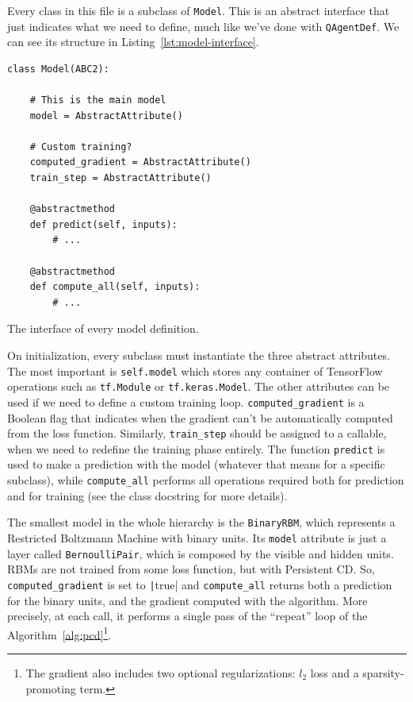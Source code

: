 Every class in this file is a subclass of \texttt{Model}. This is an abstract
interface that just indicates what we need to define, much like we've done
with \texttt{QAgentDef}. We can see its structure in
Listing~\ref{lst:model-interface}.
\begin{listing}
\begin{verbatim}
class Model(ABC2):

    # This is the main model
    model = AbstractAttribute()

    # Custom training?
    computed_gradient = AbstractAttribute()
    train_step = AbstractAttribute()

    @abstractmethod
    def predict(self, inputs):
        # ...

    @abstractmethod
    def compute_all(self, inputs):
        # ...
\end{verbatim}
\caption{The interface of every model definition.}
\label{lst:model-interface}
\end{listing}
On initialization, every subclass must instantiate the three abstract
attributes. The most important is \verb|self.model| which stores any container
of TensorFlow operations such as \verb|tf.Module| or \verb|tf.keras.Model|.
The other attributes can be used if we need to define a custom training loop.
\verb|computed_gradient| is a Boolean flag that indicates when the gradient
can't be automatically computed from the loss function. Similarly,
\verb|train_step| should be assigned to a callable, when we need to redefine
the training phase entirely.  The function \texttt{predict} is used to make a
prediction with the model (whatever that means for a specific subclass), while
\verb|compute_all| performs all operations required both for prediction and
for training (see the class docstring for more details).

The smallest model in the whole hierarchy is the \texttt{BinaryRBM}, which
represents a Restricted Boltzmann Machine with binary units. Its
\texttt{model} attribute is just a layer called \texttt{BernoulliPair}, which
is composed by the visible and hidden units. RBMs are not trained from some
loss function, but with Persistent CD. So, \verb|computed_gradient| is set to
\texttt|true| and \verb|compute_all| returns both a
prediction for the binary units, and the gradient computed with the algorithm.
More precisely, at each call, it performs a single pass of the ``repeat'' loop
of the Algorithm~\vref{alg:pcd}\footnote{The gradient also includes two
optional regularizations: $l_2$ loss and a sparsity-promoting term.}.

